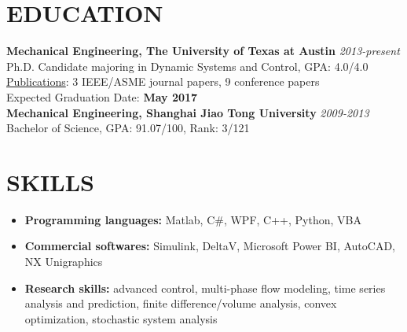 \documentclass[margin, 9pt]{res} %
\begin{document}
\begin{resume}


\vspace*{-5pt}

\vspace*{-10pt}
\section{EDUCATION}

\textbf{Mechanical Engineering, The University of Texas at Austin} \hfill\textit{2013-present} \\
Ph.D. Candidate majoring in Dynamic Systems and Control,  GPA: 4.0/4.0 \\
\href{https://scholar.google.com/citations?user=EJJUXmMAAAAJ&hl=en}{Publications}: 3 IEEE/ASME journal papers,  9 conference papers \\
Expected Graduation Date: \textbf{May 2017}\\

\vspace*{-10pt}
\textbf{Mechanical Engineering, Shanghai Jiao Tong University} \hfill\textit{2009-2013}\\
Bachelor of Science, GPA: 91.07/100, Rank: 3/121\\

\vspace*{-10pt}
\section{SKILLS}

\vspace*{-2pt}
\begin{itemize}[leftmargin=*] \itemsep -4pt
	\item {\bf Programming languages:} Matlab, C\#, WPF,  C++, Python, VBA
	\item {\bf Commercial softwares:} Simulink, DeltaV, Microsoft Power BI, AutoCAD, NX Unigraphics
	\item {\bf Research skills:} advanced control, multi-phase flow modeling, time series analysis and prediction, finite difference/volume analysis, convex optimization, stochastic system analysis
\end{itemize}


\end{resume}
\end{document}
